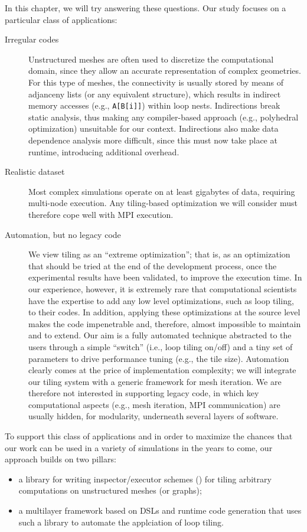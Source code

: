 In this chapter, we will try answering these questions. Our study focuses on a particular class of applications:
\begin{description}
\item[Irregular codes] Unstructured meshes are often used to discretize the computational domain, since they allow an accurate representation of complex geometries. For this type of meshes, the connectivity is usually stored by means of adjanceny lists (or any equivalent structure), which results in indirect memory accesses (e.g., \texttt{A[B[i]]}) within loop nests. Indirections break static analysis, thus making any compiler-based approach (e.g., polyhedral optimization) unsuitable for our context. Indirections also make data dependence analysis more difficult, since this must now take place at runtime, introducing additional overhead.
\item[Realistic dataset] Most complex simulations operate on at least gigabytes of data, requiring multi-node execution. Any tiling-based optimization we will consider must therefore cope well with MPI execution.
\item[Automation, but no legacy code] We view tiling as an ``extreme optimization''; that is, as an optimization that should be tried at the end of the development process, once the experimental results have been validated, to improve the execution time. In our experience, however, it is extremely rare that computational scientists have the expertise to add any low level optimizations, such as loop tiling, to their codes. In addition, applying these optimizations at the source level makes the code impenetrable and, therefore, almost impossible to maintain and to extend. Our aim is a fully automated technique abstracted to the users through a simple ``switch'' (i.e., loop tiling on/off) and a tiny set of parameters to drive performance tuning (e.g., the tile size). Automation clearly comes at the price of implementation complexity; we will integrate our tiling system with a generic framework for mesh iteration. We are therefore not interested in supporting legacy code, in which key computational aspects (e.g., mesh iteration, MPI communication) are usually hidden, for modularity, underneath several layers of software.
\end{description}

To support this class of applications and in order to maximize the chances that our work can be used in a variety of simulations in the years to come, our approach builds on two pillars:
\begin{itemize}
\item a library for writing inspector/executor schemes (\cite{IEscheme}) for tiling arbitrary computations on unstructured meshes (or graphs);
\item a multilayer framework based on DSLs and runtime code generation that uses such a library to automate the applciation of loop tiling.
\end{itemize}


